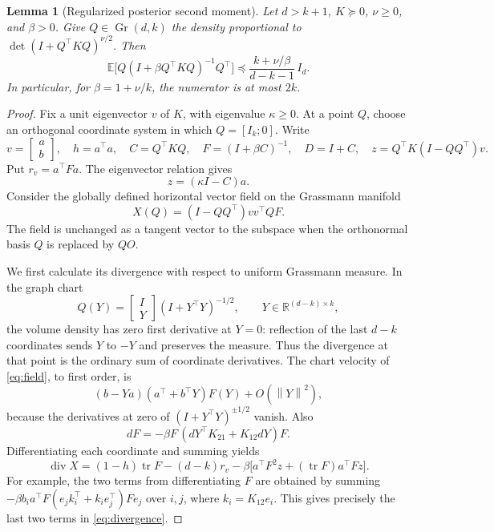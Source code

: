 \documentclass[11pt]{article}
\numberwithin{equation}{section}
\newtheorem{lemma}[theorem]{Lemma}
\theoremstyle{remark}\newtheorem{remark}[theorem]{Remark}
\newcommand{\R}{\mathbb R}
\newcommand{\E}{\mathbb E}
\newcommand{\norm}[1]{\left\lVert #1\right\rVert}
\newcommand{\tr}{\operatorname{tr}}
\newcommand{\Gr}{\operatorname{Gr}}
\newcommand{\diver}{\operatorname{div}}
\begin{document}
\begin{lemma}[Regularized posterior second moment]\label{lem:angular}
Let $d>k+1$, $K\succeq0$, $\nu\ge0$, and $\beta>0$. Give $Q\in\Gr(d,k)$ the density proportional to $\det(I+Q^\top KQ)^{\nu/2}$. Then
\begin{equation}\label{eq:angularbound}
\E\big[Q(I+\beta Q^\top KQ)^{-1}Q^\top\big]
\preceq\frac{k+\nu/\beta}{d-k-1}\,I_d.
\end{equation}
In particular, for $\beta=1+\nu/k$, the numerator is at most $2k$.
\end{lemma}
\begin{proof}
Fix a unit eigenvector $v$ of $K$, with eigenvalue $\kappa\ge0$. At a point $Q$, choose an orthogonal coordinate system in which $Q=[I_k;0]$. Write
\[
v=\begin{bmatrix}a\\ b\end{bmatrix},\quad
h=a^\top a,\quad C=Q^\top KQ,\quad
F=(I+\beta C)^{-1},\quad D=I+C,\quad
z=Q^\top K(I-QQ^\top)v.
\]
Put $r_v=a^\top Fa$. The eigenvector relation gives
\begin{equation}\label{eq:zidentity}
z=(\kappa I-C)a.
\end{equation}
Consider the globally defined horizontal vector field on the Grassmann manifold
\begin{equation}\label{eq:field}
X(Q)=(I-QQ^\top)vv^\top QF.
\end{equation}
The field is unchanged as a tangent vector to the subspace when the orthonormal basis $Q$ is replaced by $QO$.

We first calculate its divergence with respect to uniform Grassmann measure. In the graph chart
\[
Q(Y)=\begin{bmatrix}I\\Y\end{bmatrix}(I+Y^\top Y)^{-1/2},
\qquad Y\in\R^{(d-k)\times k},
\]
the volume density has zero first derivative at $Y=0$: reflection of the last $d-k$ coordinates sends $Y$ to $-Y$ and preserves the measure. Thus the divergence at that point is the ordinary sum of coordinate derivatives. The chart velocity of \eqref{eq:field}, to first order, is
\[
(b-Ya)(a^\top+b^\top Y)F(Y)+O(\norm Y^2),
\]
because the derivatives at zero of $(I+Y^\top Y)^{\pm1/2}$ vanish. Also
\[
dF=-\beta F\,(dY^\top K_{21}+K_{12}dY)F.
\]
Differentiating each coordinate and summing yields
\begin{equation}\label{eq:divergence}
\diver X=(1-h)\tr F-(d-k)r_v
-\beta\big[a^\top F^2z+(\tr F)a^\top Fz\big].
\end{equation}
For example, the two terms from differentiating $F$ are obtained by summing
$-\beta b_i a^\top F(e_jk_i^\top+k_ie_j^\top)Fe_j$ over $i,j$, where $k_i=K_{12}e_i$. This gives precisely the last two terms in \eqref{eq:divergence}.


\end{proof}
\end{document}
